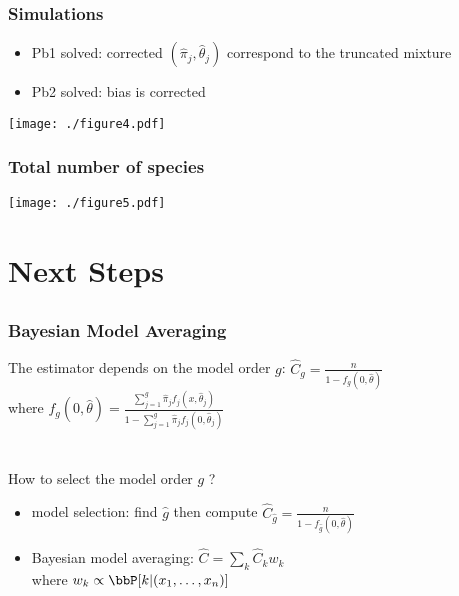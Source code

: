 \documentclass{beamer}
\begin{document}
\begin{frame}\frametitle{Simulations}

\begin{itemize}
 \item Pb1 solved: corrected $(\hat \pi_j,\hat \theta_j)$ correspond to the truncated mixture
 \item Pb2 solved: bias is corrected
\end{itemize}

\begin{center}
 \texttt{[image: ./figure4.pdf]}
\end{center}

\end{frame}


\begin{frame}\frametitle{Total number of species}
 \begin{center}
 \texttt{[image: ./figure5.pdf]}
\end{center}

\end{frame}

\section{Next Steps}
\subsection*{}

\begin{frame}\frametitle{Bayesian Model Averaging}
The estimator depends on the model order $g$: $\displaystyle \hat C_g = \frac{n}{1 - f_g(0,\hat \theta)}$ \\
where $\displaystyle f_g(0,\hat \theta) = \frac{ \sum_{j=1}^g \hat \pi_j f_j (x,\hat \theta_j )}{1-\sum_{j=1}^g \hat \pi_j f_j(0,\hat \theta_j)} $ \\

\hfill \\
\hfill \\

How to select the model order $g$ ?
\begin{itemize}
 \item model selection: find $\hat g$ then compute $\displaystyle \hat C_{\hat g} = \frac{n}{1 - f_{\hat g}(0,\hat \theta)}$
 \item Bayesian model averaging:
 $\displaystyle \hat C = \sum_{k} \hat C_k w_k$ \\
 where $w_k \propto \bbP[k|(x_1,\ldots,x_n)]$ 
\end{itemize}

\end{frame}
\end{document}
